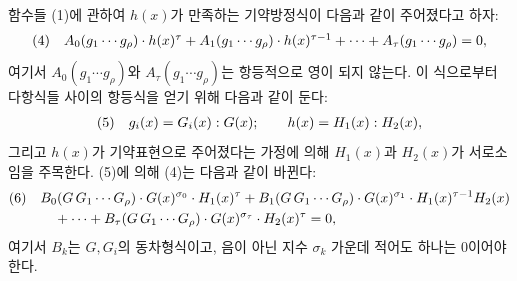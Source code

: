 
함수들 (1)에 관하여 $h(x)$가 만족하는 기약방정식이 다음과 같이 주어졌다고 하자:
\[
\begin{array}{@{}r@{\quad}l@{}}
(4)& A_0(g_1\cdots g_\rho)\cdot h(x)^\tau
 +A_1(g_1\cdots g_\rho)\cdot h(x)^{\tau-1}
 +\cdots+A_\tau(g_1\cdots g_\rho)=0,
\end{array}
\]
여기서 $A_0(g_1\cdots g_\rho)$와 $A_\tau(g_1\cdots g_\rho)$는 항등적으로 영이 되지 않는다. 이 식으로부터 다항식들 사이의 항등식을 얻기 위해 다음과 같이 둔다:
\[
\begin{array}{@{}r@{\quad}l@{}}
(5)& g_i(x)=G_i(x):G(x);\qquad h(x)=H_1(x):H_2(x),
\end{array}
\]
그리고 $h(x)$가 기약표현으로 주어졌다는 가정에 의해 $H_1(x)$과 $H_2(x)$가 서로소임을 주목한다. (5)에 의해 (4)는 다음과 같이 바뀐다:
\[
\begin{array}{@{}r@{\quad}l@{}}
(6)& \begin{aligned}[t]
&B_0(G\,G_1\cdots G_\rho)\cdot G(x)^{\sigma_0}\cdot H_1(x)^\tau
+B_1(G\,G_1\cdots G_\rho)\cdot G(x)^{\sigma_1}\cdot H_1(x)^{\tau-1}H_2(x)\\
&\quad+\cdots+B_\tau(G\,G_1\cdots G_\rho)\cdot G(x)^{\sigma_\tau}\cdot H_2(x)^\tau=0,
\end{aligned}
\end{array}
\]
여기서 $B_k$는 $G,G_i$의 동차형식이고, 음이 아닌 지수 $\sigma_k$ 가운데 적어도 하나는 0이어야 한다.
